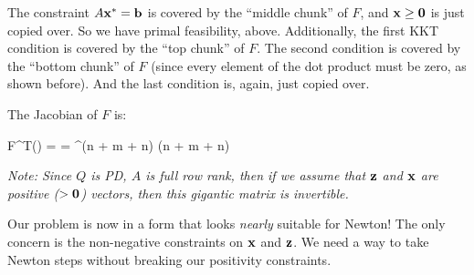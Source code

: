 The constraint $A\mathbf{x}^* = \mathbf{b}$ is covered by the ``middle chunk'' of $F$, 
and $\mathbf{x} \geq \mathbf{0}$ is just copied over. 
So we have primal feasibility, above. Additionally, the first KKT condition is 
covered by the ``top chunk'' of $F$. 
The second condition is covered by the ``bottom chunk'' of
$F$ (since every element of the dot product must be zero, as shown before). And
the last condition is, again, just copied over.


The Jacobian of $F$ is:
\begin{frml}
	\nabla F^T(\mat{\vx \\ \vy \\ \vz}) = 
	=  \in \reals^{(n + m + n) \times (n + m + n)}
\end{frml}

\textit{Note:  Since $Q$ is PD, $A$ is full row rank, then if we assume that $\mathbf{z}$ and $\mathbf{x}$
are \textit{positive} ($> \mathbf{0}$) vectors, then this gigantic matrix is invertible.}

Our problem is now in a form that looks \textit{nearly} suitable for Newton! 
The only concern is the non-negative
constraints on $\mathbf{x}$ and $\mathbf{z}$. We need a way to take Newton steps without breaking
our positivity constraints.

